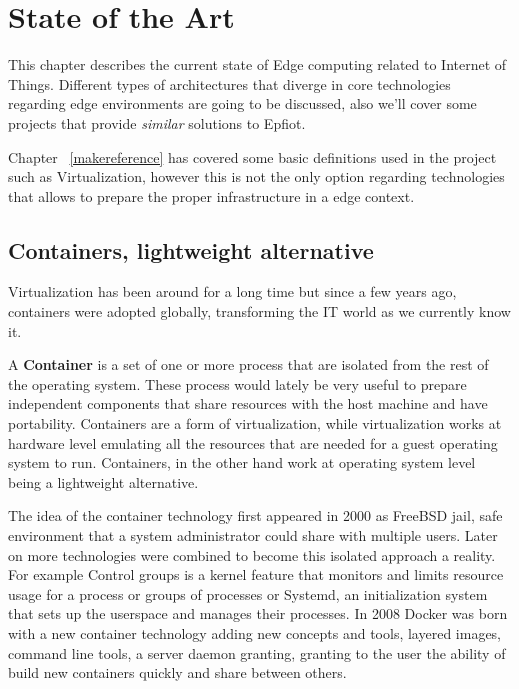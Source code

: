 
\cleardoublepage


\chapter{State of the Art}
\label{makereference2}

This chapter describes the current state of Edge computing related to Internet of Things. Different types of architectures that diverge in core technologies regarding edge environments are going to be discussed,  also we'll cover some projects that provide \textit{similar} solutions to Epfiot.

Chapter ~\ref{makereference} has covered some basic definitions used in the project such as Virtualization, however this is not the only option regarding technologies that allows to prepare the proper infrastructure in a edge context.

\section{Containers, lightweight alternative}
\label{makereference2.1}

Virtualization has been around for a long time but since a few years ago, containers were adopted globally, transforming the IT world
as we currently know it.

A \textbf{Container} is a set of one or more process that are isolated from the rest of the operating system. These process would lately be very useful to prepare independent components that share resources with the host machine and have portability. 
Containers are a form of virtualization, while virtualization works at hardware level emulating all the resources that are needed for a guest operating system to run. Containers, in the other hand work at operating system level being a lightweight alternative.

The idea of the container technology first appeared in 2000 as FreeBSD jail, safe environment that a system administrator could share with multiple users. Later on more technologies were combined to become this isolated approach a reality. For example Control groups is a kernel feature that monitors and limits resource usage for a process or groups of processes or Systemd, an initialization system that sets up the userspace and manages their processes. In 2008 Docker was born with a new container technology adding new concepts and tools, layered images, command line tools, a server daemon granting, granting to the user the ability of build new containers quickly and share between others.~\cite{redhat_container}

